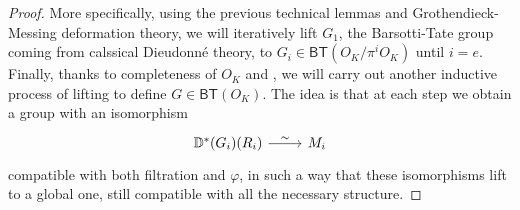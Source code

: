 \begin{proof}
More specifically, using the previous technical lemmas and Grothendieck-Messing deformation theory,
we will iteratively lift $G_1$, the Barsotti-Tate group coming from calssical Dieudonné theory,
to $G_i \in \mathsf{BT}(O_K/\pi^iO_K)$ until $i = e$.
Finally, thanks to completeness of $O_K$ and \cite[Lemma 2.4.4]{deJong},
we will carry out another inductive process of lifting
to define $G \in \mathsf{BT}(O_K)$.
The idea is that at each step we obtain a group with an isomorphism
\begin{equation*}
\begin{tikzcd}[row sep = 0ex
	,/tikz/column 1/.append style={anchor=base east}
	,/tikz/column 2/.append style={anchor=base west}]
	\mathbb{D}^*(G_i)(R_i) \arrow[r, "\sim", rightarrow] &
	M_i
\end{tikzcd}
\end{equation*} 
compatible with both filtration and $\varphi$, in such a way that these isomorphisms
lift to a global one, still compatible with all the necessary structure.


\end{proof}
